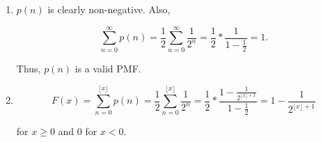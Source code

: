 \begin{enumerate}[label=(\alph*)]

\item $p(n)$ is clearly non-negative. Also, 

$$\sum_{n=0}^{\infty}p(n) = \frac{1}{2}\sum_{n=0}^{\infty}\frac{1}{2^{n}} = 
\frac{1}{2} * \frac{1}{1 - \frac{1}{2}} = 1.$$

Thus, $p(n)$ is a valid PMF.

\item $$F(x) = \sum_{n=0}^{\lfloor x \rfloor}p(n) = \frac{1}{2}\sum_{n=0}^
{\lfloor x \rfloor}\frac{1}{2^{n}} = \frac{1}{2} * \frac{1 - \frac{1}{2^{\lfloor
x \rfloor + 1}}}{1 - \frac{1}{2}} = 1 - \frac{1}{2^{\lfloor x \rfloor + 1}}$$

for $x \geq 0$ and $0$ for $x < 0$.


\end{enumerate}